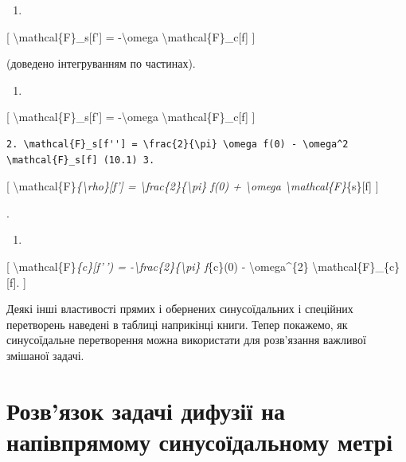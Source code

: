 \documentclass[
]{article}
\providecommand{\tightlist}{%
  \setlength{\itemsep}{0pt}\setlength{\parskip}{0pt}}
\begin{document}
\begin{enumerate}
\def\labelenumi{\arabic{enumi}.}
\tightlist
\item
\end{enumerate}

{[} \textbackslash mathcal\{F\}\_s{[}f'{]} = -\textbackslash omega
\textbackslash mathcal\{F\}\_c{[}f{]} {]}

(доведено інтегруванням по частинах).

\begin{enumerate}
\def\labelenumi{\arabic{enumi}.}
\tightlist
\item
\end{enumerate}

{[} \textbackslash mathcal\{F\}\_s{[}f'{]} = -\textbackslash omega
\textbackslash mathcal\{F\}\_c{[}f{]} {]}

\begin{verbatim}
2. \mathcal{F}_s[f''] = \frac{2}{\pi} \omega f(0) - \omega^2 \mathcal{F}_s[f] (10.1) 3.
\end{verbatim}

{[} \textbackslash mathcal\{F\}\emph{\{\textbackslash rho\}{[}f'{]} =
\textbackslash frac\{2\}\{\textbackslash pi\} f(0) +
\textbackslash omega \textbackslash mathcal\{F\}}\{s\}{[}f{]} {]}

.

\begin{enumerate}
\def\labelenumi{\arabic{enumi}.}
\setcounter{enumi}{3}
\tightlist
\item
\end{enumerate}

{[} \textbackslash mathcal\{F\}\emph{\{c\}{[}f'\,') =
-\textbackslash frac\{2\}\{\textbackslash pi\} f}\{c\}(0) -
\textbackslash omega\^{}\{2\} \textbackslash mathcal\{F\}\_\{c\}{[}f{]}.
{]}

Деякі інші властивості прямих і обернених синусоїдальних і спеційних
перетворень наведені в таблиці наприкінці книги. Тепер покажемо, як
синусоїдальне перетворення можна використати для розв'язання важливої
змішаної задачі.

\section{Розв'язок задачі дифузії на напівпрямому синусоїдальному
метрі}\label{ux440ux43eux437ux432ux44fux437ux43eux43a-ux437ux430ux434ux430ux447ux456-ux434ux438ux444ux443ux437ux456ux457-ux43dux430-ux43dux430ux43fux456ux432ux43fux440ux44fux43cux43eux43cux443-ux441ux438ux43dux443ux441ux43eux457ux434ux430ux43bux44cux43dux43eux43cux443-ux43cux435ux442ux440ux456}
\end{document}
